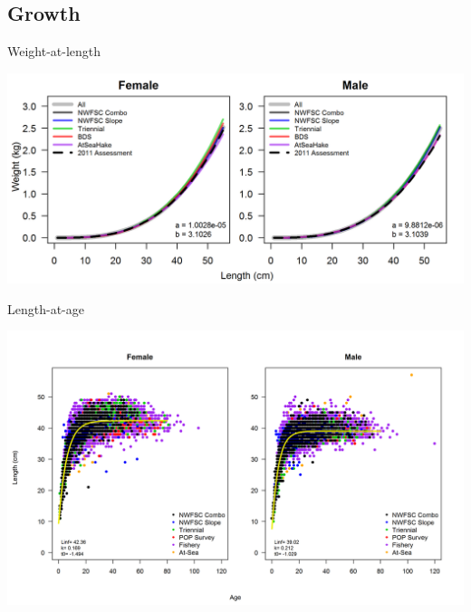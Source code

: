 \documentclass[pdf]{beamer}\usepackage[]{graphicx}\usepackage[]{color}
\begin{document}
\subsection{Growth}
\begin{frame}{Weight-at-length}
  \begin{center}
    \includegraphics[scale = 0.75]{figures/weightAtLengthPred.png}
  \end{center}
\end{frame}

\begin{frame}{Length-at-age}
  \begin{center}
  \includegraphics[scale = 0.5]{figures/LengthAgeAll_2.png}
  \end{center}
\end{frame}
\end{document}
